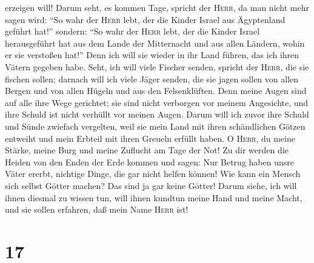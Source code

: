 erzeigen will!  Darum seht, es kommen Tage, spricht der
\textsc{Herr}, da man nicht mehr sagen wird: ``So wahr der \textsc{Herr}
lebt, der die Kinder Israel aus Ägyptenland geführt hat!'' sondern:
 ``So wahr der \textsc{Herr} lebt, der die Kinder Israel
herausgeführt hat aus dem Lande der Mitternacht und aus allen Ländern,
wohin er sie verstoßen hat!'' Denn ich will sie wieder in ihr Land
führen, das ich ihren Vätern gegeben habe.  Seht, ich
will viele Fischer senden, spricht der \textsc{Herr}, die sie fischen
sollen; darnach will ich viele Jäger senden, die sie jagen sollen von
allen Bergen und von allen Hügeln und aus den Felsenklüften.
 Denn meine Augen sind auf alle ihre Wege gerichtet; sie
sind nicht verborgen vor meinem Angesichte, und ihre Schuld ist nicht
verhüllt vor meinen Augen.  Darum will ich zuvor ihre
Schuld und Sünde zwiefach vergelten, weil sie mein Land mit ihren
schändlichen Götzen entweiht und mein Erbteil mit ihren Greueln erfüllt
haben.  O \textsc{Herr}, du meine Stärke, meine Burg und
meine Zuflucht am Tage der Not! Zu dir werden die Heiden von den Enden
der Erde kommen und sagen: Nur Betrug haben unsre Väter ererbt, nichtige
Dinge, die gar nicht helfen können!  Wie kann ein Mensch
sich selbst Götter machen? Das sind ja gar keine Götter! 
Darum siehe, ich will ihnen diesmal zu wissen tun, will ihnen kundtun
meine Hand und meine Macht, und sie sollen erfahren, daß mein Name
\textsc{Herr} ist!

\hypertarget{section-16}{%
\section{17}\label{section-16}}

